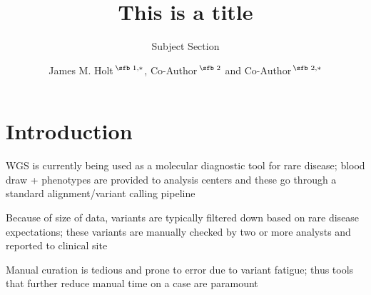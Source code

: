 \documentclass{bioinfo}
\begin{document}

\subtitle{Subject Section}

\title[short Title]{This is a title}
\author[Holt \textit{et~al}.]{James M. Holt\,$^{\text{\sfb 1,}*}$, Co-Author\,$^{\text{\sfb 2}}$ and Co-Author\,$^{\text{\sfb 2,}*}$}
\address{$^{\text{\sf 1}}$Department, Institution, City, Post Code, Country and \\
$^{\text{\sf 2}}$Department, Institution, City, Post Code,
Country.}





\maketitle

\section{Introduction}


WGS is currently being used as a molecular diagnostic tool for rare disease; blood draw + phenotypes are provided to analysis centers and these go through a standard alignment/variant calling pipeline

Because of size of data, variants are typically filtered down based on rare disease expectations; these variants are manually checked by two or more analysts and reported to clinical site

Manual curation is tedious and prone to error due to variant fatigue; thus tools that further reduce manual time on a case are paramount

\end{document}
